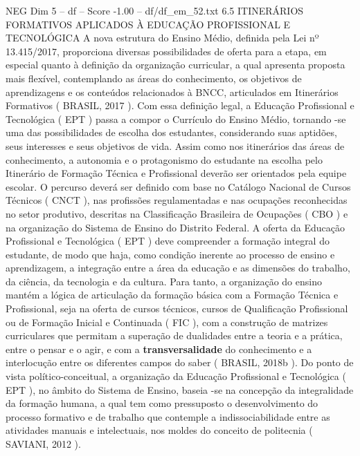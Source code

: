 \begin{textsample}{NEG Dim 5 – df – Score -1.00 – df/df\_em\_52.txt}  \label{ex:f5_neg_137}
6.5 ITINERÁRIOS FORMATIVOS APLICADOS À EDUCAÇÃO PROFISSIONAL E TECNOLÓGICA A nova estrutura do Ensino Médio, definida pela Lei nº 13.415/2017, proporciona diversas possibilidades de oferta para a etapa, em especial quanto à definição da organização curricular, a qual apresenta proposta mais flexível, contemplando as áreas do conhecimento, os objetivos de aprendizagens e os conteúdos relacionados à BNCC, articulados em Itinerários Formativos ( BRASIL, 2017 ).
Com essa definição legal, a Educação Profissional e Tecnológica ( EPT ) passa a compor o Currículo do Ensino Médio, tornando -se uma das possibilidades de escolha dos estudantes, considerando suas aptidões, seus interesses e seus objetivos de vida.
Assim como nos itinerários das áreas de conhecimento, a autonomia e o protagonismo do estudante na escolha pelo Itinerário de Formação Técnica e Profissional deverão ser orientados pela equipe escolar.
O percurso deverá ser definido com base no Catálogo Nacional de Cursos Técnicos ( CNCT ), nas profissões regulamentadas e nas ocupações reconhecidas no setor produtivo, descritas na Classificação Brasileira de Ocupações ( CBO ) e na organização do Sistema de Ensino do Distrito Federal.
A oferta da Educação Profissional e Tecnológica ( EPT ) deve compreender a formação integral do estudante, de modo que haja, como condição inerente ao processo de ensino e aprendizagem, a integração entre a área da educação e as dimensões do trabalho, da ciência, da tecnologia e da cultura.
Para tanto, a organização do ensino mantém a lógica de articulação da formação básica com a Formação Técnica e Profissional, seja na oferta de cursos técnicos, cursos de Qualificação Profissional ou de Formação Inicial e Continuada ( FIC ), com a construção de matrizes curriculares que permitam a superação de dualidades entre a teoria e a prática, entre o pensar e o agir, e com a \textbf{transversalidade} do conhecimento e a interlocução entre os diferentes campos do saber ( BRASIL, 2018b ).
Do ponto de vista político-conceitual, a organização da Educação Profissional e Tecnológica ( EPT ), no âmbito do Sistema de Ensino, baseia -se na concepção da integralidade da formação humana, a qual tem como pressuposto o desenvolvimento do processo formativo e de trabalho que contemple a indissociabilidade entre as atividades manuais e intelectuais, nos moldes do conceito de politecnia ( SAVIANI, 2012 ).

\end{textsample}

